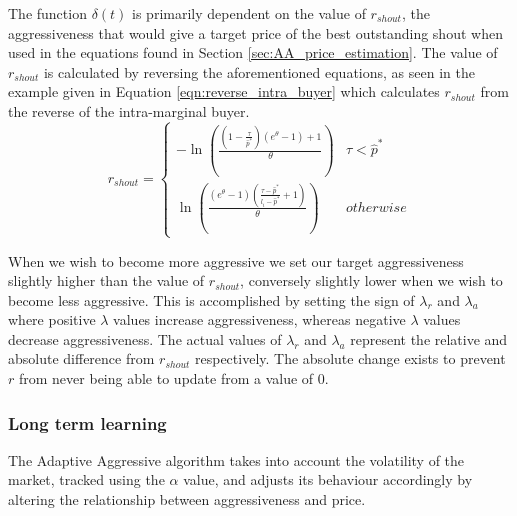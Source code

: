 \documentclass[preprint]{acm_proc_article-sp} %
\begin{document}
The function $\delta(t)$ is primarily dependent on the value of $r_{shout}$, the aggressiveness that 
would give a target price of the best outstanding shout when used in the equations found in Section 
\ref{sec:AA_price_estimation}. The value of $r_{shout}$ is calculated by reversing the aforementioned 
equations, as seen in the example given in Equation \ref{eqn:reverse_intra_buyer} which calculates 
$r_{shout}$ from the reverse of the intra-marginal buyer.
\begin{equation}
r_{shout}=
\begin{cases}
 -\ln\left(\frac{ \left( 1-\frac{\tau}{\hat p^*} \right) \left( e^\theta-1 \right) + 1}{\theta}\right) & \tau
< \hat p^*\\
\ln\left( \frac{ \left( e^\theta -1 \right) \left( \frac{\tau - \hat p^*}{l_i - \hat p^*} + 1 \right)
}{\theta} \right)&
\textstyle{otherwise}
\end{cases}
\label{eqn:reverse_intra_buyer}
\end{equation}

When we wish to become more aggressive we set our target aggressiveness slightly higher than the
value of $r_{shout}$, conversely slightly lower when we wish to become less aggressive. This is accomplished by
setting the sign of $\lambda_r$ and $\lambda_a$ where positive $\lambda$ values increase aggressiveness,
 whereas negative $\lambda$ values decrease aggressiveness.
The actual values of $\lambda_r$ and $\lambda_a$ represent the relative and absolute difference from $r_{shout}$
respectively. The absolute change exists to prevent $r$ from never being able
to update from a value of 0.\\



\subsubsection{Long term learning} \label{sec:AA_long_term_learning}
The Adaptive Aggressive algorithm takes into account the volatility of the market, tracked using the
$\alpha$ value, and adjusts its behaviour accordingly by altering the relationship between aggressiveness and price.
\end{document}

